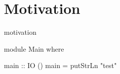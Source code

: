 \section{Motivation}
\label{sec:motivation}

motivation

\begin{code}
module Main where

main :: IO ()
main = putStrLn "test"
\end{code}
